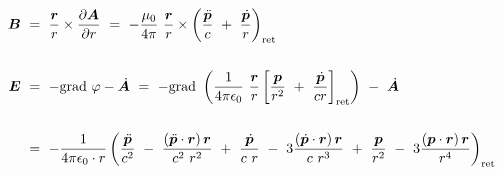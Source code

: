\begin{align*}
\vec{B} \ &= \ \frac{\vec{r}}{r}\times\pdiff{\vec{A}}{r} \ = \ - \frac{\mu_0}{4\pi} \ \frac{\vec{r}}{r}\times \left(\frac{\ddot{\vec{p}}}{c}\ + \ \frac{\dot{\vec{p}}}{r}\right)_{\text{ret}}\\
\ \\
\vec{E} \ &= \ - \grad\varphi - \dot{\vec{A}} \ = \ -\grad\left(\frac{1}{4\pi\epsilon_0} \ \frac{\vec{r}}{r} \left[\frac{\vec{p}}{r^2} \ + \ \frac{\dot{\vec{p}}}{cr}\right]_{\text{ret}}\right) \ - \ \dot{\vec{A}}\\
\ \\
&= \ -\frac{1}{4\pi\epsilon_0 \cdot r} \left(\frac{\ddot{\vec{p}}}{c^2} \ - \ \frac{\left(\ddot{\vec{p}}\cdot\vec{r}\right)\vec{r}}{c^2 \ r^2} \ + \ \frac{\dot{\vec{p}}}{c \ r} \ - \ 3 \frac{\left(\dot{\vec{p}}\cdot\vec{r}\right)\vec{r}}{c \ r^3} \ + \ \frac{\vec{p}}{r^2} \ - \ 3 \frac{\left(\vec{p}\cdot\vec{r}\right)\vec{r}}{r^4}\right)_{\text{ret}}
\end{align*}

